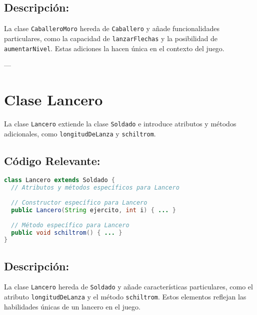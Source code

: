 \subsection*{Descripción:}

La clase \texttt{CaballeroMoro} hereda de \texttt{Caballero} y añade funcionalidades particulares, como la capacidad de \texttt{lanzarFlechas} y la posibilidad de \texttt{aumentarNivel}. Estas adiciones la hacen única en el contexto del juego.

---

\section{Clase Lancero}

La clase \texttt{Lancero} extiende la clase \texttt{Soldado} e introduce atributos y métodos adicionales, como \texttt{longitudDeLanza} y \texttt{schiltrom}.

\subsection*{Código Relevante:}

\begin{lstlisting}[language=Java]
class Lancero extends Soldado {
  // Atributos y métodos específicos para Lancero
  
  // Constructor específico para Lancero
  public Lancero(String ejercito, int i) { ... }
  
  // Método específico para Lancero
  public void schiltrom() { ... }
}
\end{lstlisting}

\subsection*{Descripción:}

La clase \texttt{Lancero} hereda de \texttt{Soldado} y añade características particulares, como el atributo \texttt{longitudDeLanza} y el método \texttt{schiltrom}. Estos elementos reflejan las habilidades únicas de un lancero en el juego.
